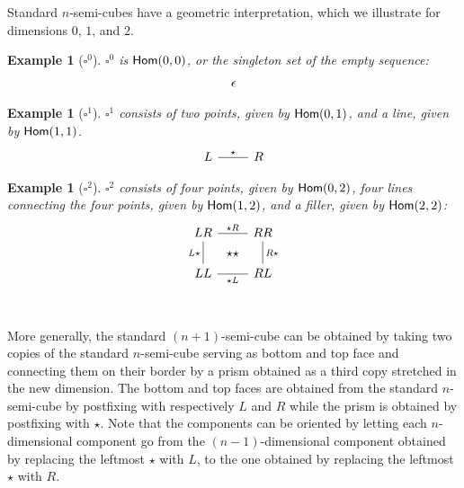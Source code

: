 \documentclass{msc}
\newcommand{\Cube}{\ensuremath{\boldsymbol{{\square}}}}
\newtheorem{example}[therm]{Example}
\newcommand{\kstar}{{\star}}
\begin{document}
Standard $n$-semi-cubes have a geometric interpretation, which we illustrate for dimensions $0$, $1$, and $2$.

\begin{example}[$\Cube^0$]
  $\Cube^0$ is $\mathsf{Hom}(0, 0)$, or the singleton set of the empty sequence:
  \begin{equation*}
    \begin{tikzcd}
      \epsilon
    \end{tikzcd}
  \end{equation*}
\end{example}

\begin{example}[$\Cube^1$]
  $\Cube^1$ consists of two points, given by $\mathsf{Hom}(0, 1)$, and a line, given by $\mathsf{Hom}(1, 1)$.
  \begin{equation*}
    \begin{tikzcd}
      L \arrow[r, "\kstar", dash] & R
    \end{tikzcd}
  \end{equation*}
\end{example}

\begin{example}[$\Cube^2$]
  $\Cube^2$ consists of four points, given by $\mathsf{Hom}(0, 2)$, four lines connecting the four points, given by $\mathsf{Hom}(1, 2)$, and a filler, given by $\mathsf{Hom}(2, 2)$:
  \begin{equation*}
    \begin{tikzcd}
      LR \arrow[r, dash, "\kstar R"{name=F}] \arrow[d, dash, "L\kstar" left] & RR \arrow[d, dash, "R\kstar"] \\
      LL \arrow[r, dash, "\kstar L"{name=T, below}] & RL \\
      \arrow[rightarrow, from=F, to=T, phantom, "\kstar\kstar" description]
    \end{tikzcd}
  \end{equation*}
\end{example}

More generally, the standard $(n + 1)$-semi-cube can be obtained by taking two copies of the standard $n$-semi-cube serving as bottom and top face and connecting them on their border by a prism obtained as a third copy stretched in the new dimension. The bottom and top faces are obtained from the standard $n$-semi-cube by postfixing with respectively $L$ and $R$ while the prism is obtained by postfixing with $\kstar$. Note that the components can be oriented by letting each $n$-dimensional component go from the $(n-1)$-dimensional component obtained by replacing the leftmost $\kstar$ with $L$, to the one obtained by replacing the leftmost $\kstar$ with $R$.
\end{document}
